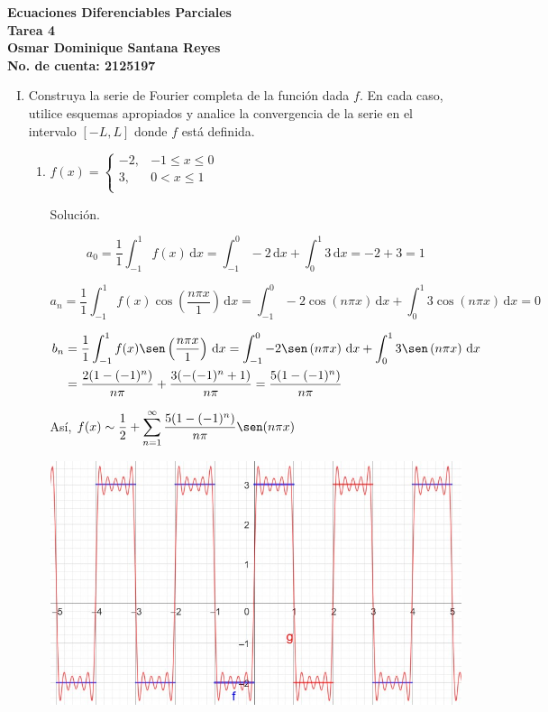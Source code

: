 \documentclass[fleqn]{article}
\newcommand{\intg}[3]{\int_{#1}^{#2} #3 \, \mathrm{d}x}
\begin{document}
	\bfseries
	Ecuaciones Diferenciables Parciales \\
	Tarea 4 \\
	Osmar Dominique Santana Reyes \\
	No. de cuenta: 2125197 \\

	\begin{enumerate}[I.]
		\item Construya la serie de Fourier completa de la función dada $f$. En cada caso, utilice esquemas apropiados y analice la convergencia de la serie en el intervalo $ [-L,L] $ donde $f$ está definida.
		
		\begin{enumerate}[(1)]
			\item $ f(x) = \begin{cases}
				-2, & -1 \leq x \leq 0 \\
				3, & 0 < x \leq 1 \\
			\end{cases} $

			Solución.

			\normalfont

			\begin{equation*}
				a_0 = \dfrac{1}{1} \intg{-1}{1}{f(x)} = \intg{-1}{0}{-2} + \intg{0}{1}{3} = -2 + 3 = 1
			\end{equation*}

			\begin{equation*}
				a_n = \dfrac{1}{1} \intg{-1}{1}{f(x) \cos \left( \dfrac{n \pi x}{1} \right)} = \intg{-1}{0}{-2 \cos \left(n \pi x \right)} + \intg{0}{1}{3 \cos \left(n \pi x \right)} = 0
			\end{equation*}

			\begin{align*}
				b_n &= \dfrac{1}{1} \intg{-1}{1}{f(x) \sen \left( \dfrac{n \pi x}{1} \right)} = \intg{-1}{0}{-2 \sen \left(n \pi x \right)} + \intg{0}{1}{3 \sen \left(n \pi x \right)} \\
				&= \dfrac{2(1 - (-1)^n)}{n \pi} + \dfrac{3(-(-1)^n + 1)}{n \pi} = \dfrac{5(1 - (-1)^n)}{n \pi}
			\end{align*}

			Así, $ \displaystyle f(x) \sim \dfrac{1}{2} + \sum_{n=1}^{\infty} \dfrac{5(1 - (-1)^n)}{n \pi} \sen (n \pi x) $

			\includegraphics[width=\linewidth]{Ejer1.jpg}


\end{enumerate}
\end{enumerate}
\end{document}
